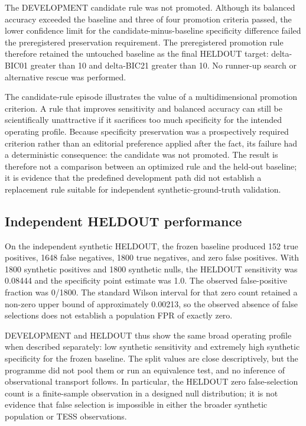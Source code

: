 \documentclass[11pt,a4paper]{article}
\begin{document}
The DEVELOPMENT candidate rule was not promoted. Although its balanced accuracy exceeded the baseline and three of four promotion criteria passed, the lower confidence limit for the candidate-minus-baseline specificity difference failed the preregistered preservation requirement. The preregistered promotion rule therefore retained the untouched baseline as the final HELDOUT target: delta-BIC01 greater than 10 and delta-BIC21 greater than 10. No runner-up search or alternative rescue was performed.

The candidate-rule episode illustrates the value of a multidimensional promotion criterion. A rule that improves sensitivity and balanced accuracy can still be scientifically unattractive if it sacrifices too much specificity for the intended operating profile. Because specificity preservation was a prospectively required criterion rather than an editorial preference applied after the fact, its failure had a deterministic consequence: the candidate was not promoted. The result is therefore not a comparison between an optimized rule and the held-out baseline; it is evidence that the predefined development path did not establish a replacement rule suitable for independent synthetic-ground-truth validation.

\subsection{Independent HELDOUT performance}
On the independent synthetic HELDOUT, the frozen baseline produced 152 true positives, 1648 false negatives, 1800 true negatives, and zero false positives. With 1800 synthetic positives and 1800 synthetic nulls, the HELDOUT sensitivity was 0.08444 and the specificity point estimate was 1.0. The observed false-positive fraction was 0/1800. The standard Wilson interval for that zero count retained a non-zero upper bound of approximately 0.00213, so the observed absence of false selections does not establish a population FPR of exactly zero.

DEVELOPMENT and HELDOUT thus show the same broad operating profile when described separately: low synthetic sensitivity and extremely high synthetic specificity for the frozen baseline. The split values are close descriptively, but the programme did not pool them or run an equivalence test, and no inference of observational transport follows. In particular, the HELDOUT zero false-selection count is a finite-sample observation in a designed null distribution; it is not evidence that false selection is impossible in either the broader synthetic population or TESS observations.
\end{document}
